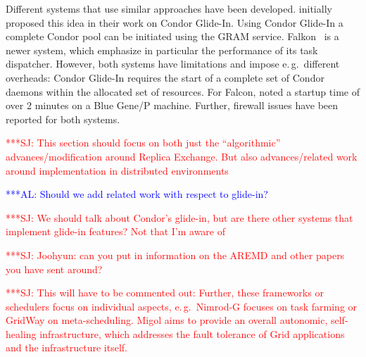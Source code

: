 \documentclass{rspublic}
\newcommand{\alnote}[1]{ {\textcolor{blue} { ***AL: #1 }}}
\newcommand{\jhanote}[1]{ {\textcolor{red} { ***SJ: #1 }}}
\newcommand{\alnote}[1]{}
\newcommand{\jhanote}[1]{}
\newcommand{\glidein}[1]{Glide-In }
\begin{document}
Different systems that use similar approaches have been
developed. \citet{citeulike:291860} initially proposed this idea in
their work on Condor Glide-In. Using Condor Glide-In a complete Condor
pool can be initiated using the GRAM service. Falkon~\citet{1362680}
is a newer system, which emphasize in particular the performance of
its task dispatcher.  However, both systems have limitations and
impose e.\,g.\ different overheads: Condor \glidein\ requires the
start of a complete set of Condor daemons within the allocated set of
resources. For Falcon, \citet{citeulike:3169002} noted a startup time
of over 2 minutes on a Blue Gene/P machine. Further, firewall issues
have been reported for both systems.


\jhanote{This section should focus on both just the ``algorithmic''
  advances/modification around Replica Exchange. But also
  advances/related work around  implementation in distributed
  environments}
                       
\alnote{Should we add related work with respect to glide-in?}

\jhanote{We should talk about Condor's glide-in, but are there other
  systems that implement glide-in features? Not that I'm aware of}

\jhanote{Joohyun: can you put in information on the AREMD and other
  papers you have sent around?}


                                 
\jhanote{This will have to be commented out: Further, these frameworks
  or schedulers focus on individual aspects, e.\,g.\ Nimrod-G focuses
  on task farming or GridWay on meta-scheduling. Migol aims to provide
  an overall autonomic, self-healing infrastructure, which addresses
  the fault tolerance of Grid applications and the infrastructure
  itself.}
\end{document}
